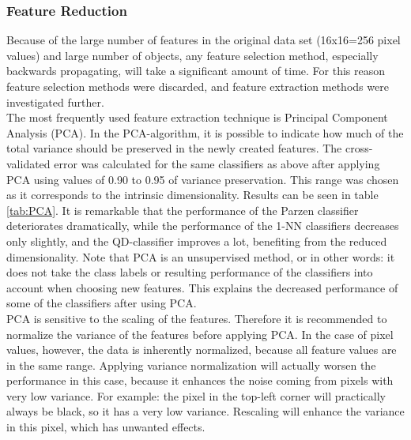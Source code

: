\subsubsection*{Feature Reduction}
Because of the large number of features in the original data set (16x16=256 pixel values) and large number of objects, any feature selection method, especially backwards propagating, will take a significant amount of time. For this reason feature selection methods were discarded, and feature extraction methods were investigated further. \\
The most frequently used feature extraction technique is Principal Component Analysis (PCA). In the PCA-algorithm, it is possible to indicate how much of the total variance should be preserved in the newly created features. The cross-validated error was calculated for the same classifiers as above after applying PCA using values of 0.90 to 0.95 of variance preservation. This range was chosen as it corresponds to the intrinsic dimensionality. Results can be seen in table \ref{tab:PCA}. It is remarkable that the performance of the Parzen classifier deteriorates dramatically, while the performance of the 1-NN classifiers decreases only slightly, and the QD-classifier improves a lot, benefiting from the reduced dimensionality. Note that PCA is an unsupervised method, or in other words: it does not take the class labels or resulting performance of the classifiers into account when choosing new features. This explains the decreased performance of some of the classifiers after using PCA. \\
PCA is sensitive to the scaling of the features. Therefore it is recommended to normalize the variance of the features before applying PCA. In the case of pixel values, however, the data is inherently normalized, because all feature values are in the same range. Applying variance normalization will actually worsen the performance in this case, because it enhances the noise coming from pixels with very low variance. For example: the pixel in the top-left corner will practically always be black, so it has a very low variance. Rescaling will enhance the variance in this pixel, which has unwanted effects. \\
